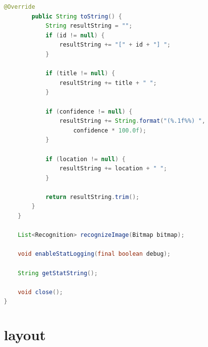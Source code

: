 \documentclass[UTF8, Microsoft YaHei]{book}
\begin{document}
\begin{small}
\begin{lstlisting}[language=java]
        @Override
        public String toString() {
            String resultString = "";
            if (id != null) {
                resultString += "[" + id + "] ";
            }

            if (title != null) {
                resultString += title + " ";
            }

            if (confidence != null) {
                resultString += String.format("(%.1f%%) ",
                	confidence * 100.0f);
            }

            if (location != null) {
                resultString += location + " ";
            }

            return resultString.trim();
        }
    }

    List<Recognition> recognizeImage(Bitmap bitmap);

    void enableStatLogging(final boolean debug);

    String getStatString();

    void close();
}
\end{lstlisting}
\end{small}
    \section{layout}
\end{document}
